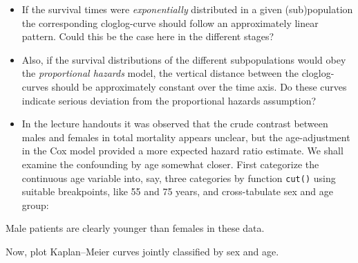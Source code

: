 \documentclass[
]{book}
\newenvironment{Shaded}{\begin{snugshade}}{\end{snugshade}}
\newcommand{\AttributeTok}[1]{\textcolor[rgb]{0.13,0.29,0.53}{#1}}
\newcommand{\ConstantTok}[1]{\textcolor[rgb]{0.56,0.35,0.01}{#1}}
\newcommand{\DecValTok}[1]{\textcolor[rgb]{0.00,0.00,0.81}{#1}}
\newcommand{\FunctionTok}[1]{\textcolor[rgb]{0.13,0.29,0.53}{\textbf{#1}}}
\newcommand{\NormalTok}[1]{#1}
\newcommand{\OtherTok}[1]{\textcolor[rgb]{0.56,0.35,0.01}{#1}}
\newcommand{\SpecialCharTok}[1]{\textcolor[rgb]{0.81,0.36,0.00}{\textbf{#1}}}
\begin{document}
\begin{itemize}
\item
  If the survival times were \emph{exponentially} distributed in a given
  (sub)population the corresponding cloglog-curve should follow an
  approximately linear pattern. Could this be the case here in the
  different stages?
\item
  Also, if the survival distributions of the different subpopulations
  would obey the \emph{proportional hazards} model, the vertical distance
  between the cloglog-curves should be approximately constant over the
  time axis. Do these curves indicate serious deviation from the
  proportional hazards assumption?
\item
  In the lecture handouts it was observed that the crude contrast
  between males and females in total mortality appears unclear, but the
  age-adjustment in the Cox model provided a more expected hazard ratio
  estimate. We shall examine the confounding by age somewhat closer.
  First categorize the continuous age variable into, say, three
  categories by function \texttt{cut()} using suitable breakpoints, like 55 and
  75 years, and cross-tabulate sex and age group:
\end{itemize}

\begin{Shaded}
\end{Shaded}

Male patients are clearly younger than females in these data.

Now, plot Kaplan--Meier curves jointly classified by sex and age.
\end{document}
